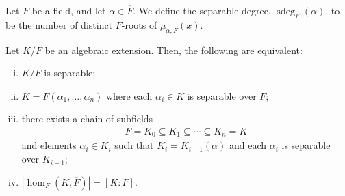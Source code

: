 \documentclass[10pt]{mypackage}
\begin{document}
\begin{definition}
  Let $F$ be a field, and let $ \alpha\in \overline{F} $. We define the separable degree, $\operatorname{sdeg}_F\left( \alpha \right)$, to be the number of distinct $ \overline{F} $-roots of $\mu_{\alpha,F}(x)$.
\end{definition}
\begin{proposition}
  Let $K/F$ be an algebraic extension. Then, the following are equivalent:
  \begin{enumerate}[(i)]
    \item $K/F$ is separable;
    \item $K = F\left( \alpha_1,\dots,\alpha_n \right)$ where each $\alpha_i\in K$ is separable over $F$;
    \item there exists a chain of subfields 
      \begin{align*}
        F = K_0\subseteq K_1\subseteq \cdots \subseteq K_n = K
      \end{align*}
      and elements $\alpha_i\in K_i$ such that $K_i = K_{i-1}\left( \alpha \right)$ and each $\alpha_i$ is separable over $K_{i-1}$;
    \item $\left\vert \hom_F\left( K, \overline{F} \right) \right\vert = \left[ K:F \right]$.
  \end{enumerate}
\end{proposition}
\end{document}
